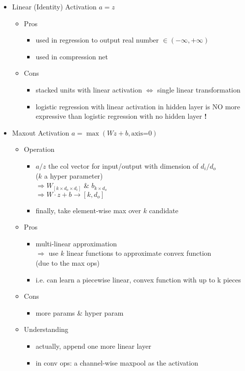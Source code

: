 \begin{itemize}
\item Linear (Identity) Activation $a=z$
	\begin{itemize}
	\item Pros
		\begin{itemize}
		\item used in regression to output real number $\in (-\infty, +\infty)$
		\item used in compression net
		\end{itemize}
	\item Cons
		\begin{itemize}
		\item stacked units with linear activation $\Leftrightarrow$ single linear transformation
		\item logistic regression with linear activation in hidden layer is NO more expressive than logistic regression with no hidden layer \textbf{!}
		\end{itemize}
	\end{itemize}
	
\item Maxout Activation $a=\max (Wz+b, \text{axis=0})$
	\begin{itemize}
	\item Operation
		\begin{itemize}
		\item $a/z$ the col vector for input/output with dimension of $d_i/d_o$ \\
		($k$ a hyper parameter) \\
		$\Rightarrow W_{[k\times d_o\times d_i]}$ \& $b_{k\times d_o}$ \\
		$\Rightarrow W\cdot z + b \rightarrow [k,d_o]$
		\item finally, take element-wise max over $k$ candidate
		\end{itemize}
	\item Pros
		\begin{itemize}
		\item multi-linear approximation \\
		$\Rightarrow$ use $k$ linear functions to approximate convex function \\
		(due to the max ops)
		\item i.e. can learn a piecewise linear, convex function with up to k pieces
		\end{itemize}
	\item Cons
		\begin{itemize}
		\item more params \& hyper param
		\end{itemize}
	\item Understanding
		\begin{itemize}
		\item actually, append one more linear layer
		\item in conv ops: a channel-wise maxpool as the activation
		\end{itemize}
	\end{itemize}
\end{itemize}

